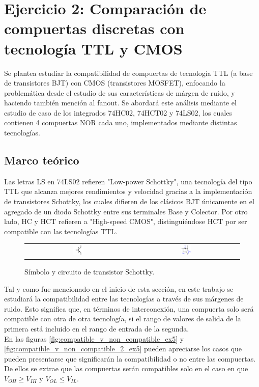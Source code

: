 \section{Ejercicio 2: Comparaci\'on de compuertas discretas con tecnolog\'ia TTL y CMOS}
Se plantea estudiar la compatibilidad de compuertas de tecnología TTL (a base de transistores BJT) con CMOS (transistores MOSFET), enfocando la problemática desde el 
estudio de sus características de márgen de ruido, y haciendo también mención al fanout. 
Se abordará este análisis mediante el estudio de caso de los integrados 74HC02, 74HCT02 y 74LS02, los cuales contienen 4 compuertas NOR cada uno, implementados mediante 
distintas tecnologías.



\subsection{Marco teórico}
Las letras LS en 74LS02 refieren "Low-power Schottky", una tecnología del tipo TTL que alcanza mejores rendimientos y velocidad gracias a la implementación de 
transistores Schottky, los cuales difieren de los clásicos BJT únicamente en el agregado de un diodo Schottky entre sus terminales Base y Colector.
Por otro lado, HC y HCT refieren a "High-speed CMOS", distinguiéndose HCT por ser compatible con las tecnologías TTL.

\begin{figure}[H]
    \centering
    \begin{tabular}{c c}
        \includegraphics[width=0.1\textwidth]{../EJ2/Recursos/schottky_transistor_symbol} &
        \includegraphics[width=0.1\textwidth]{../EJ2/Recursos/schottky_transistor_circuit}
    \end{tabular}
    \caption{Símbolo y circuito de transistor Schottky.}
    \label{fig:schottky_transistor_symbol_and_circuit_ex5}
\end{figure}

Tal y como fue mencionado en el inicio de esta sección, en este trabajo se estudiará la compatibilidad entre las tecnologías a través de sus márgenes de ruido.
Esto significa que, en términos de interconexión, una compuerta solo será compatible con otra de otra tecnología, si el rango de valores de salida de la primera está 
incluido en el rango de entrada de la segunda. \\
En las figuras \ref{fig:compatible_v_non_compatible_ex5} y \ref{fig:compatible_v_non_compatible_2_ex5} pueden apreciarse los casos que pueden presentarse que significarán la compatibilidad o no entre las compuertas.
De ellos se extrae que las compuertas serán compatibles solo en el caso en que $V_{OH} \geq V_{IH}$ y $V_{OL} \leq V_{IL}$.

